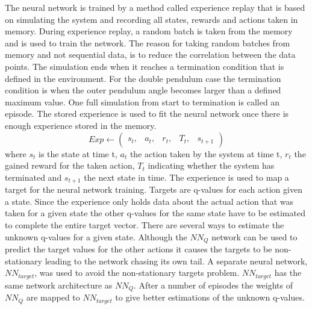 \documentclass{LTHtwocol} %
\begin{document}
The neural network is trained by a method called experience replay that is based on simulating the system and recording all states, rewards and actions taken in memory.
During experience replay, a random batch is taken from the memory and is used to train the network.
The reason for taking random batches from memory and not sequential data, is to reduce the correlation between the data points.
The simulation ends when it reaches a termination condition that is defined in the environment.
For the double pendulum case the termination condition is when the outer pendulum angle becomes larger than a defined maximum value.
One full simulation from start to termination is called an episode.
The stored experience is used to fit the neural network once there is enough experience stored in the memory.
\begin{equation}
	Exp \leftarrow \begin{pmatrix}s_t, & a_t, & r_t, & T_t, & s_{t+1}	\end{pmatrix}
\end{equation}
where $s_t$ is the state at time t, $a_t$ the action taken by the system at time t, $r_t$ the gained reward for the taken action, $T_t$ indicating whether the system has terminated and $s_{t+1}$ the next state in time.
The experience is used to map a target for the neural network training.
Targets are q-values for each action given a state.
Since the experience only holds data about the actual action that was taken for a given state the other q-values for the same state have to be estimated to complete the entire target vector.
There are several ways to estimate the unknown q-values for a given state.
Although the $NN_Q$ network can be used to predict the target values for the other actions it causes the targets to be non-stationary leading to the network chasing its own tail.
A separate neural network, $NN_{target}$, was used to avoid the non-stationary targets problem.
$NN_{target}$ has the same network architecture as $NN_Q$.
After a number of episodes the weights of $NN_Q$ are mapped to $NN_{target}$ to give better estimations of the unknown q-values.
\end{document}

